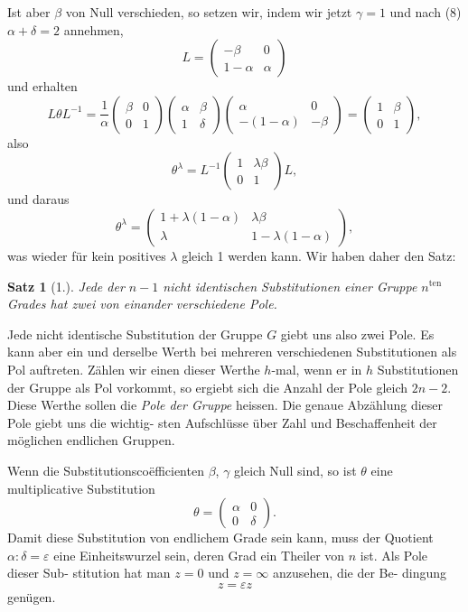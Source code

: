 \documentclass[12pt,a4paper]{article}
\theoremstyle{plain}
\newtheorem{satz}{Satz}[section]
\theoremstyle{definition}
\theoremstyle{remark}
\begin{document}
Ist aber $\beta$ von Null verschieden, so setzen wir, indem wir
jetzt $\gamma = 1$ und nach (8) $\alpha + \delta = 2$ annehmen,
\[
L = \begin{pmatrix}-\beta & 0\\ 1-\alpha & \alpha\end{pmatrix}
\]
und erhalten
\[
L\theta L^{-1} = \frac{1}{\alpha}\begin{pmatrix}\beta & 0\\ 0 & 1\end{pmatrix}\begin{pmatrix}\alpha & \beta\\ 1 & \delta\end{pmatrix}
\begin{pmatrix}\alpha & 0\\ -(1-\alpha) & -\beta\end{pmatrix}
= \begin{pmatrix}1 & \beta\\ 0 & 1\end{pmatrix},
\]
also
\[
\theta^\lambda = L^{-1}\begin{pmatrix}1 & \lambda\beta\\ 0 & 1\end{pmatrix}L,
\]
und daraus
\[
\theta^\lambda = \begin{pmatrix}1+\lambda(1-\alpha) & \lambda\beta\\ \lambda & 1-\lambda(1-\alpha)\end{pmatrix},
\]
was wieder f\"ur kein positives $\lambda$ gleich 1 werden kann. Wir
haben daher den Satz:

\begin{satz}[1.]
Jede der $n-1$ nicht identischen Substitutionen
einer Gruppe $n^{\text{ten}}$ Grades hat zwei von einander
verschiedene Pole.
\end{satz}

Jede nicht identische Substitution der Gruppe $G$ giebt uns
also zwei Pole. Es kann aber ein und derselbe Werth bei
mehreren verschiedenen Substitutionen als Pol auftreten. Z\"ahlen
wir einen dieser Werthe $h$-mal, wenn er in $h$ Substitutionen der
Gruppe als Pol vorkommt, so ergiebt sich die Anzahl der Pole
gleich $2n-2$. Diese Werthe sollen die \emph{Pole der Gruppe}
heissen. Die genaue Abz\"ahlung dieser Pole giebt uns die wichtig-
sten Aufschl\"usse \"uber Zahl und Beschaffenheit der m\"oglichen
endlichen Gruppen.

Wenn die Substitutionsco\"efficienten $\beta$, $\gamma$ gleich Null sind, so
ist $\theta$ eine multiplicative Substitution
\[
\theta = \begin{pmatrix}\alpha & 0\\ 0 & \delta\end{pmatrix}.
\]
Damit diese Substitution von endlichem Grade sein kann,
muss der Quotient $\alpha : \delta = \varepsilon$ eine Einheitswurzel sein,
deren Grad ein Theiler von $n$ ist. Als Pole dieser Sub-
stitution hat man $z=0$ und $z=\infty$ anzusehen, die der Be-
dingung
\[
z = \varepsilon z
\]
gen\"ugen.
\end{document}
